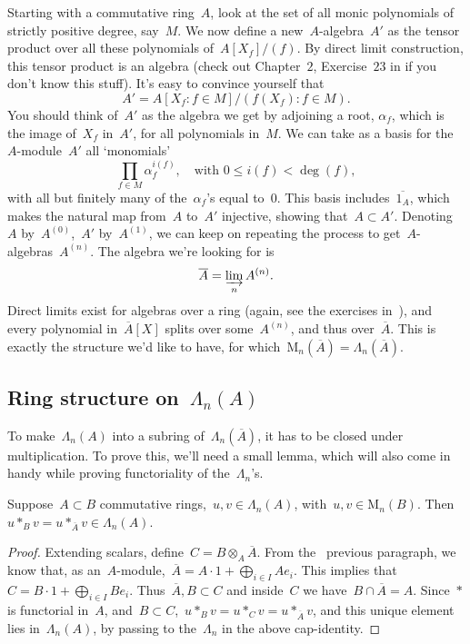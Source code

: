Starting with a commutative ring~$A$, look at the set of all monic polynomials of strictly positive degree, say~$M$. We now define a new~$A$-algebra~$A'$ as the tensor product over all these polynomials of~$A[X_{f}]/(f)$. By direct limit construction, this tensor product is an algebra (check out Chapter~$2$, Exercise~$23$ in \cite{atiyah-macdonald} if you don't know this stuff). It's easy to convince yourself that
\begin{equation}
  A'=A[X_{f}:f \in M]/(f(X_{f}):f \in M).
\end{equation}
You should think of~$A'$ as the algebra we get by adjoining a root, $\alpha_{f}$, which is the image of~$X_{f}$ in~$A'$, for all polynomials in~$M$. We can take as a basis for the~$A$-module~$A'$ all `monomials'
\begin{equation}
  \prod_{f \in M} \alpha_{f}^{i(f)}, \quad\text{with } 0\leq i(f) < \deg(f), 
\end{equation}
with all but finitely many of the~$\alpha_{f}$'s equal to~$0$. This basis includes~$\overline{1_{A}}$, which makes the natural map from~$A$ to~$A'$ injective, showing that~$A \subset A'$. Denoting~$A$ by~$A^{(0)}$,~$A'$ by~$A^{(1)}$, we can keep on repeating the process to get~$A$-algebras~$A^{(n)}$. The algebra we're looking for is
\begin{equation}
  \overline{A}=\varinjlim_{n} A^{(n)}. 
\end{equation}
Direct limits exist for algebras over a ring (again, see the exercises in~\cite{atiyah-macdonald}), and every polynomial in~$\overline{A}[X]$ splits over some~$A^{(n)}$, and thus over~$\overline{A}$. This is exactly the structure we'd like to have, for which~$\mathrm{M}_{n}(\overline{A})=\Lambda_{n}(\overline{A})$.

\subsection{Ring structure on~$\Lambda_{n}(A)$}

To make~$\Lambda_{n}(A)$ into a subring of~$\Lambda_{n}(\overline{A})$, it has to be closed under multiplication. To prove this, we'll need a small lemma, which will also come in handy while proving functoriality of the~$\Lambda_{n}$'s.

\begin{lemma}
  Suppose~$A \subset B$ commutative rings,~$u,v \in \Lambda_{n}(A)$, with~$u, v \in \mathrm{M}_{n}(B)$. Then~$u*_{B}v = u*_{\overline{A}}v \in \Lambda_{n}(A)$.

  \begin{proof}
    Extending scalars, define~$C=B \otimes_{A} \overline{A}$. From the  previous paragraph, we know that, as an~$A$-module,~$\overline{A}=A \cdot 1 + \bigoplus_{i \in I} Ae_{i}$. This implies that~$C=B \cdot 1 + \bigoplus_{i \in I} Be_{i}$. Thus~$\overline{A}, B \subset C$ and inside~$C$ we have~$B \cap \overline{A}=A$. Since~$*$ is functorial in~$A$, and~$B \subset C$,~$u*_{B}v=u*_{C} v=u  *_{\overline{A}}  v$, and this unique element lies in~$\Lambda_{n}(A)$, by passing to the~$\Lambda_{n}$ in the above cap-identity.
  \end{proof}
\end{lemma}

